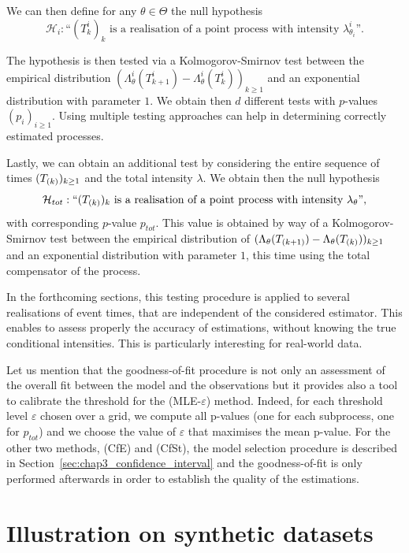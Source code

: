     We can then define for any $\theta\in\Theta$ the null hypothesis
    \[
      \mathcal H_i : \text{``} (T_k^i)_k \text{ is a realisation of a point process with intensity } \lambda_{\theta_i}^i \text{''}.
    \]
    
    The hypothesis is then tested via a Kolmogorov-Smirnov test between the empirical distribution $(\Lambda_\theta^i(T_{k+1}^i) - \Lambda_\theta^i(T_k^i))_{k\geq 1}$ and an exponential distribution with parameter $1$. We obtain then $d$ different tests with $p$-values $(p_i)_{i\geq 1}$.
    Using multiple testing approaches can help in determining correctly estimated processes.

    Lastly, we can obtain an additional test by considering the entire sequence of times $(T\park)_{k\geq 1}$ and the total intensity $\lambda$. We obtain then the null hypothesis
    \[
      \mathcal{H}_{tot} : \text{``} (T\park)_k \text{ is a realisation of a point process with intensity } \lambda_\theta \text{''},
    \]
    with corresponding $p$-value $p_{tot}$. This value is obtained by way of a Kolmogorov-Smirnov test between the empirical distribution of $(\Lambda_\theta(T\park[k+1]) - \Lambda_\theta(T\park[k]))_{k\geq 1}$ and an exponential distribution with parameter $1$, this time using the total compensator of the process.

    In the forthcoming sections, this testing procedure is applied to several realisations of event times, that are independent of the considered estimator.
    This enables to assess properly the accuracy of estimations, without knowing the true conditional intensities.
    This is particularly interesting for real-world data.

    Let us mention that the goodness-of-fit procedure is not only an assessment of the overall fit between the model and the observations but it provides also a tool to calibrate the threshold for the (MLE-$\varepsilon$) method. Indeed, for each threshold level $\varepsilon$ chosen over a grid, we compute all p-values (one for each subprocess, one for $p_{tot}$) and we choose the value of $\varepsilon$ that maximises the mean p-value. For the other two methods, (CfE) and (CfSt), the model selection procedure is described in Section~\ref{sec:chap3_confidence_interval} and the goodness-of-fit is only performed afterwards in order to establish the quality of the estimations.

\section{Illustration on synthetic datasets}\label{sec:chap3_numerical}
